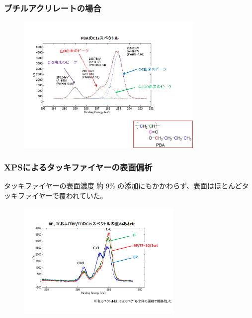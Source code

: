 \documentclass[12pt, dvipdfmx]{beamer}
\begin{document}
\begin{frame}\frametitle{ブチルアクリレートの場合}

\begin{figure}
	\begin{center}
		\includegraphics[width=90mm]{XPS_BA.png}
	\end{center}

\end{figure}

\end{frame}

\begin{frame}\frametitle{XPSによるタッキファイヤーの表面偏析}

\vspace{-0.2\baselineskip}
\begin{alertblock}{タッキファイヤーの表面濃度}
約 $9\%$ の添加にもかかわらず、表面はほとんどタッキファイヤーで覆われていた。
\end{alertblock}

\vspace{-0.4\baselineskip}
\begin{figure}
	\begin{center}
		\includegraphics[width=80mm]{XPS_TF.png}
	\end{center}
\end{figure}
\end{frame}
\end{document}
